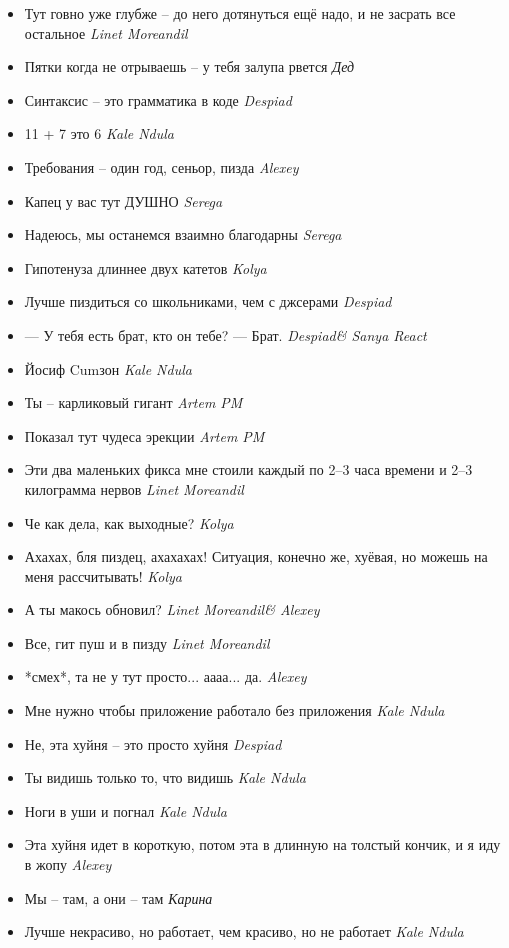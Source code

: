 \documentclass[11pt]{book}
\newcommand{\entry}[2] {\large{\textmd{#1}} \textemdash \small{\emph{#2}}}
\newcommand{\kn}{Kale Ndula}
\newcommand{\lm}{Linet Moreandil}
\newcommand{\dd}{Despiad}
\newcommand{\al}{Alexey}
\newcommand{\se}{Serega}
\newcommand{\nb}{Kolya}
\begin{document}
\begin{itemize}[leftmargin=0cm]
\item \entry{Тут говно уже глубже -- до него дотянуться ещё надо, и не засрать все остальное}{\lm}
\item \entry{Пятки когда не отрываешь -- у тебя залупа рвется}{Дед}
\item \entry{Синтаксис -- это грамматика в коде}{\dd}
\item \entry{11 + 7 это 6}{\kn}
\item \entry{Требования -- один год, сеньор, пизда}{\al}
\item \entry{Капец у вас тут ДУШНО}{\se}
\item \entry{Надеюсь, мы останемся взаимно благодарны}{\se}
\item \entry{Гипотенуза длиннее двух катетов}{\nb}
\item \entry{Лучше пиздиться со школьниками, чем с джсерами}{\dd}
\item \entry{--- У тебя есть брат, кто он тебе? --- Брат.}{\dd \& Sanya React}
\item \entry{Йосиф Cumзон}{\kn}
\item \entry{Ты -- карликовый гигант}{Artem PM}
\item \entry{Показал тут чудеса эрекции}{Artem PM}
\item \entry{Эти два маленьких фикса мне стоили каждый по 2--3 часа времени и 2--3 килограмма нервов}{\lm}
\item \entry{Че как дела, как выходные?}{\nb}
\item \entry{Ахахах, бля пиздец, ахахахах! Ситуация, конечно же, хуёвая, но можешь на меня рассчитывать!}{\nb}
\item \entry{А ты макось обновил?}{\lm \& \al}
\item \entry{Все, гит пуш и в пизду}{\lm}
\item \entry{*смех*, та не у тут просто... аааа... да.}{\al}
\item \entry{Мне нужно чтобы приложение работало без приложения}{\kn}
\item \entry{Не, эта хуйня -- это просто хуйня}{\dd}
\item \entry{Ты видишь только то, что видишь}{\kn}
\item \entry{Ноги в уши и погнал}{\kn}
\item \entry{Эта хуйня идет в короткую, потом эта в длинную на толстый кончик, и я иду в жопу}{\al}
\item \entry{Мы -- там, а они -- там}{Карина}
\item \entry{Лучше некрасиво, но работает, чем красиво, но не работает}{\kn}

\end{itemize}
\end{document}
